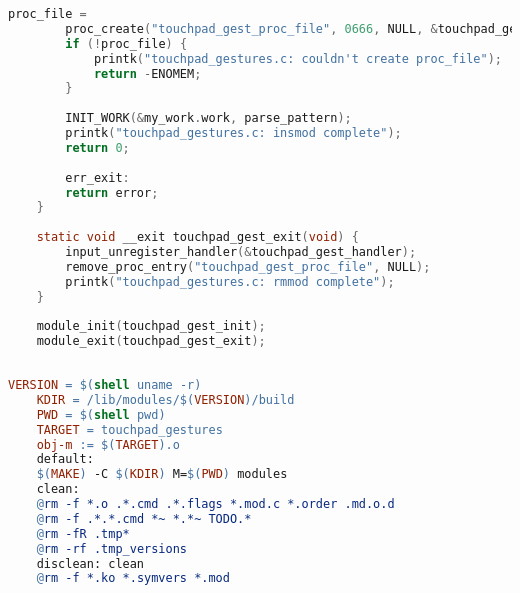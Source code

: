 \begin{lstlisting}[label=lst:module,caption=Реализация загружаемого модуля ядра, language=c]
		proc_file =
		proc_create("touchpad_gest_proc_file", 0666, NULL, &touchpad_gest_fops);
		if (!proc_file) {
			printk("touchpad_gestures.c: couldn't create proc_file");
			return -ENOMEM;
		}
		
		INIT_WORK(&my_work.work, parse_pattern);
		printk("touchpad_gestures.c: insmod complete");
		return 0;
		
		err_exit:
		return error;
	}
	
	static void __exit touchpad_gest_exit(void) {
		input_unregister_handler(&touchpad_gest_handler);
		remove_proc_entry("touchpad_gest_proc_file", NULL);
		printk("touchpad_gestures.c: rmmod complete");
	}
	
	module_init(touchpad_gest_init);
	module_exit(touchpad_gest_exit);
	
\end{lstlisting}

\clearpage

 \label{app:make}

\begin{lstlisting}[label=code:makefie, caption=Makefile, language=make]
	VERSION = $(shell uname -r)
	KDIR = /lib/modules/$(VERSION)/build
	PWD = $(shell pwd)
	TARGET = touchpad_gestures
	obj-m := $(TARGET).o
	default:
	$(MAKE) -C $(KDIR) M=$(PWD) modules
	clean:
	@rm -f *.o .*.cmd .*.flags *.mod.c *.order .md.o.d
	@rm -f .*.*.cmd *~ *.*~ TODO.*
	@rm -fR .tmp*
	@rm -rf .tmp_versions
	disclean: clean
	@rm -f *.ko *.symvers *.mod
	
\end{lstlisting}

